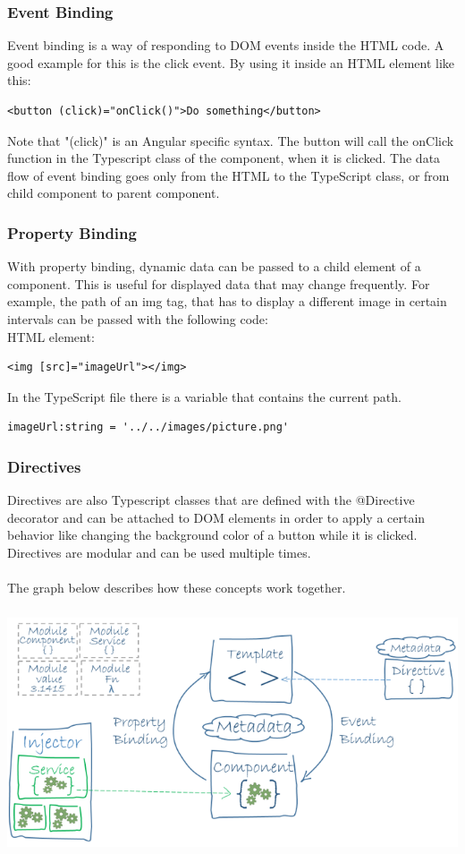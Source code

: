 \subsubsection{Event Binding}
Event binding is a way of responding to DOM events inside the HTML code. A good example for this is the click event. By using it inside an HTML element like this:
\begin{Verbatim}[frame=single]
 <button (click)="onClick()">Do something</button>
\end{Verbatim}
Note that "(click)" is an Angular specific syntax. The button will call the onClick function in the Typescript class of the component, when it is clicked. The data flow of event binding goes only from the HTML to the TypeScript class, or from child component to parent component.
\pagebreak
\subsubsection{Property Binding}
With property binding, dynamic data can be passed to a child element of a component. This is useful for displayed data that may change frequently. For example, the path of an img tag, that has to display a different image in certain intervals can be passed with the following code:\\[0.5cm]
HTML element:
\begin{Verbatim}[frame=single]
 <img [src]="imageUrl"></img>
\end{Verbatim}
In the TypeScript file there is a variable that contains the current path.
\begin{Verbatim}[frame=single]
 imageUrl:string = '../../images/picture.png'
\end{Verbatim}

\subsubsection{Directives}
Directives are also Typescript classes that are defined with the @Directive decorator and can be attached to DOM elements in order to apply a certain behavior like changing the background color of a button while it is clicked. Directives are modular and can be used multiple times.\\\\
The graph below describes how these concepts work together. \\[0.5cm]
\includegraphics [height=8cm, width=15cm] {images/angular-component-structure}
\pagebreak

